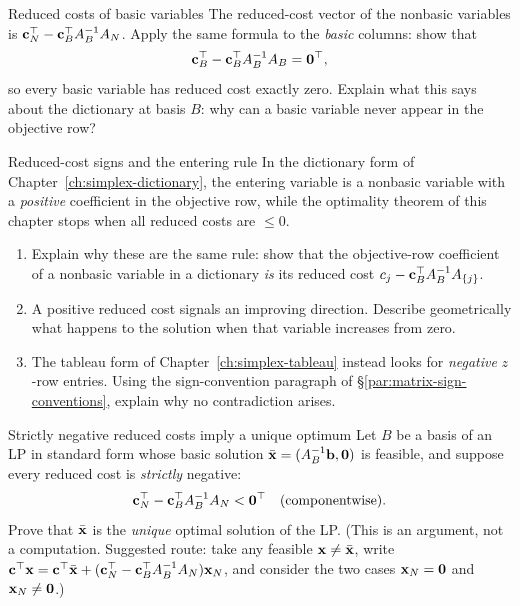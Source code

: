 
\begin{ex}{Reduced costs of basic variables}{}
\label{ex:matrix-basic-reduced-zero}
 The reduced-cost vector of the nonbasic variables is \( \mathbf{c}_N^\top - \mathbf{c}_B^\top A_B^{-1} A_N \).  Apply the same formula to the \emph{basic} columns: show that
\[
\mathbf{c}_B^\top - \mathbf{c}_B^\top A_B^{-1} A_B = \mathbf{0}^\top,
\]
so every basic variable has reduced cost exactly zero.  Explain what this says about the dictionary at basis \( B \): why can a basic variable never appear in the objective row?
\exrefs{\S\ref{sec:optimality-conditions}}
\end{ex}

\begin{ex}{Reduced-cost signs and the entering rule}{}
\label{ex:matrix-sign-conventions}
 In the dictionary form of Chapter~\ref{ch:simplex-dictionary}, the entering variable is a nonbasic variable with a \emph{positive} coefficient in the objective row, while the optimality theorem of this chapter stops when all reduced costs are \( \leq 0 \).
\begin{enumerate}
    \item Explain why these are the same rule: show that the objective-row coefficient of a nonbasic variable in a dictionary \emph{is} its reduced cost \( c_j - \mathbf{c}_B^\top A_B^{-1} A_{\{j\}} \).
    \item A positive reduced cost signals an improving direction.  Describe geometrically what happens to the solution when that variable increases from zero.
    \item The tableau form of Chapter~\ref{ch:simplex-tableau} instead looks for \emph{negative} \( z \)-row entries.  Using the sign-convention paragraph of \S\ref{par:matrix-sign-conventions}, explain why no contradiction arises.
\end{enumerate}
\end{ex}


\begin{ex}{Strictly negative reduced costs imply a unique optimum}{}
\label{ex:matrix-unique-optimum}
 Let \( B \) be a basis of an LP in standard form whose basic solution \( \bar{\mathbf{x}} = (A_B^{-1}\mathbf{b}, \mathbf{0}) \) is feasible, and suppose every reduced cost is \emph{strictly} negative:
\[
\mathbf{c}_N^\top - \mathbf{c}_B^\top A_B^{-1} A_N < \mathbf{0}^\top \quad \mbox{(componentwise)}.
\]
Prove that \( \bar{\mathbf{x}} \) is the \emph{unique} optimal solution of the LP.  (This is an argument, not a computation.  Suggested route: take any feasible \( \mathbf{x} \neq \bar{\mathbf{x}} \), write \( \mathbf{c}^\top \mathbf{x} = \mathbf{c}^\top \bar{\mathbf{x}} + (\mathbf{c}_N^\top - \mathbf{c}_B^\top A_B^{-1} A_N)\mathbf{x}_N \), and consider the two cases \( \mathbf{x}_N = \mathbf{0} \) and \( \mathbf{x}_N \neq \mathbf{0} \).)
\end{ex}

